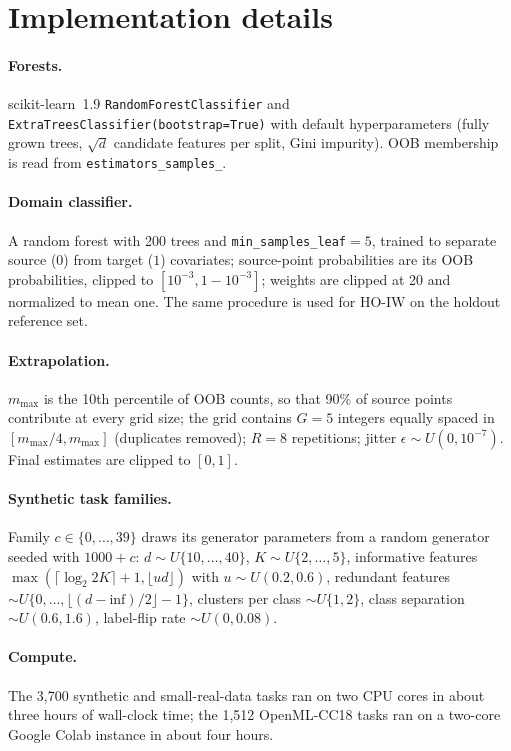 \appendix
\section{Implementation details}
\label{app:impl}
\paragraph{Forests.} scikit-learn~1.9 \texttt{RandomForestClassifier} and \texttt{ExtraTreesClassifier(bootstrap=True)} with default hyperparameters (fully grown trees, $\sqrt d$ candidate features per split, Gini impurity). OOB membership is read from \texttt{estimators\_samples\_}.
\paragraph{Domain classifier.} A random forest with 200 trees and \texttt{min\_samples\_leaf}$=5$, trained to separate source ($0$) from target ($1$) covariates; source-point probabilities are its OOB probabilities, clipped to $[10^{-3},1-10^{-3}]$; weights are clipped at 20 and normalized to mean one. The same procedure is used for HO-IW on the holdout reference set.
\paragraph{Extrapolation.} $m_{\max}$ is the 10th percentile of OOB counts, so that 90\% of source points contribute at every grid size; the grid contains $G=5$ integers equally spaced in $[m_{\max}/4,m_{\max}]$ (duplicates removed); $R=8$ repetitions; jitter $\epsilon\sim U(0,10^{-7})$. Final estimates are clipped to $[0,1]$.
\paragraph{Synthetic task families.} Family $c\in\{0,\dots,39\}$ draws its generator parameters from a random generator seeded with $1000+c$: $d\sim U\{10,\dots,40\}$, $K\sim U\{2,\dots,5\}$, informative features $\max(\lceil\log_2 2K\rceil+1,\lfloor u d\rfloor)$ with $u\sim U(0.2,0.6)$, redundant features $\sim U\{0,\dots,\lfloor(d-\text{inf})/2\rfloor-1\}$, clusters per class $\sim U\{1,2\}$, class separation $\sim U(0.6,1.6)$, label-flip rate $\sim U(0,0.08)$.
\paragraph{Compute.} The 3{,}700 synthetic and small-real-data tasks ran on two CPU cores in about three hours of wall-clock time; the 1{,}512 OpenML-CC18 tasks ran on a two-core Google Colab instance in about four hours.

